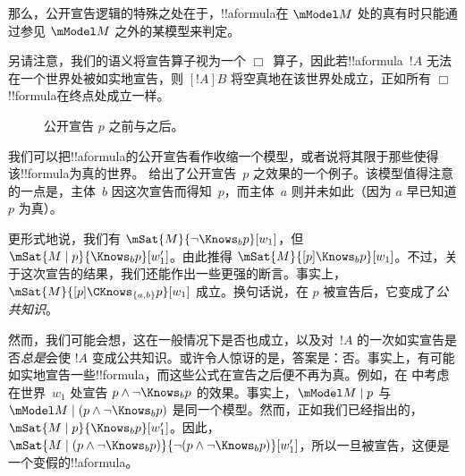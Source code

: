 \documentclass[../../../include/open-logic-section]{subfiles}
\begin{document}
那么，公开宣告逻辑的特殊之处在于，!!a{formula}在 $\mModel M$ 处的真有时只能通过参见 $\mModel M$ 之外的某模型来判定。

另请注意，我们的语义将宣告算子视为一个 $\Box$~算子，因此若!!a{formula}~$!A$ 无法在一个世界处被如实地宣告，则 $[!A]B$ 将空真地在该世界处成立，正如所有 $\Box$ !!{formula}在终点处成立一样。

\begin{figure}
  \begin{center}
  \end{center}
  \caption{公开宣告 $p$ 之前与之后。}
\end{figure}

我们可以把!!a{formula}的公开宣告看作收缩一个模型，或者说将其限于那些使得该!!{formula}为真的世界。 给出了公开宣告~$p$ 之效果的一个例子。该模型值得注意的一点是，主体~$b$ 因这次宣告而得知~$p$，而主体~$a$ 则并未如此（因为 $a$ 早已知道 $p$ 为真）。

更形式地说，我们有 $\mSat{M}{\lnot \Knows_b p}[w_1]$，但 $\mSat{M
\mid p}{\Knows_b p}[w'_1]$。由此推得 $\mSat{M}{[p] \Knows_b
p}[w_1]$。不过，关于这次宣告的结果，我们还能作出一些更强的断言。事实上，$\mSat{M}{[p]\CKnows_{\{a,b\}} p}[w_1]$ 成立。换句话说，在 $p$ 被宣告后，它变成了\emph{公共知识}。

然而，我们可能会想，这在一般情况下是否也成立，以及对~$!A$ 的一次如实宣告是否\emph{总是}会使 $!A$ 变成公共知识。或许令人惊讶的是，答案是：否。事实上，有可能如实地宣告一些!!{formula}，而这些公式在宣告之后便不再为真。例如，在  中考虑在世界~$w_1$ 处宣告 $p \land \lnot \Knows_b p$ 的效果。事实上，$\mModel M \mid p$ 与
$\mModel M \mid (p \land \lnot \Knows_b p)$ 是同一个模型。然而，正如我们已经指出的，$\mSat{M \mid p}{\Knows_b
p}[w'_1]$。因此，$\mSat{M \mid (p \land \lnot \Knows_b p)}{\lnot
(p \land \lnot \Knows_b p)}[w'_1]$，所以一旦被宣告，这便是一个变假的!!a{formula}。
\end{document}
